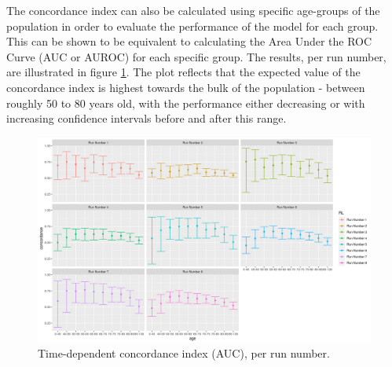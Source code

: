 \documentclass[
]{article}
\begin{document}
The concordance index can also be calculated using specific age-groups
of the population in order to evaluate the performance of the model for
each group. This can be shown to be equivalent to calculating the Area
Under the ROC Curve (AUC or AUROC) for each specific group. The results,
per run number, are illustrated in figure \ref{fig:timConc}. The plot
reflects that the expected value of the concordance index is highest
towards the bulk of the population - between roughly 50 to 80 years old,
with the performance either decreasing or with increasing confidence
intervals before and after this range.

\begin{figure}
\hypertarget{fig:timConc}{%
\centering
\includegraphics{./Plots/Survival/TimeDep_Concordance.png}
\caption{Time-dependent concordance index (AUC), per run
number.}\label{fig:timConc}
}
\end{figure}
\end{document}
